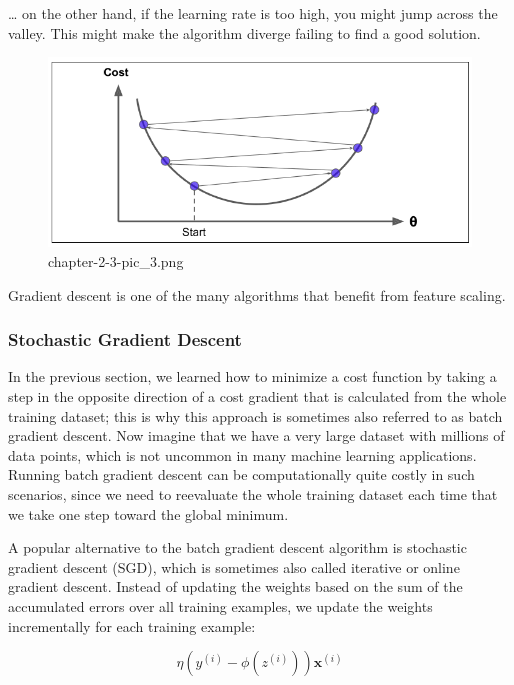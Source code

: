 \documentclass[11pt]{article}
\begin{document}
    \ldots{} on the other hand, if the learning rate is too high, you might
jump across the valley. This might make the algorithm diverge failing to
find a good solution.

    \begin{figure}
\centering
\includegraphics{./pic/chapter-2-3-pic_3.png}
\caption{chapter-2-3-pic\_3.png}
\end{figure}

    Gradient descent is one of the many algorithms that benefit from feature
scaling.

    \hypertarget{stochastic-gradient-descent}{%
\subsubsection{Stochastic Gradient
Descent}\label{stochastic-gradient-descent}}

    In the previous section, we learned how to minimize a cost function by
taking a step in the opposite direction of a cost gradient that is
calculated from the whole training dataset; this is why this approach is
sometimes also referred to as batch gradient descent. Now imagine that
we have a very large dataset with millions of data points, which is not
uncommon in many machine learning applications. Running batch gradient
descent can be computationally quite costly in such scenarios, since we
need to reevaluate the whole training dataset each time that we take one
step toward the global minimum.

A popular alternative to the batch gradient descent algorithm is
stochastic gradient descent (SGD), which is sometimes also called
iterative or online gradient descent. Instead of updating the weights
based on the sum of the accumulated errors over all training examples,
we update the weights incrementally for each training example:

\[\eta \left( y^{(i)} - \phi\left(z^{(i)} \right)\right)\mathbf{x}^{(i)}\]
\end{document}
